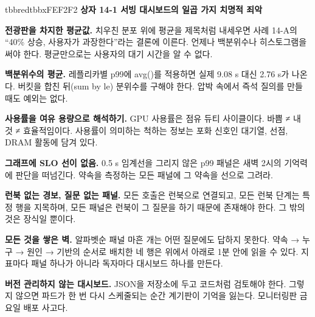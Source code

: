 \begin{calloutbox}{tbbred}{tbbxFEF2F2}
{\normalsize\bfseries\color{tbbx991B1B}상자 14-1  서빙 대시보드의 일곱 가지 치명적 죄악}\par\vspace{3pt}
\begin{tbbitemize}
  \item \textbf{전광판을 차지한 평균값.} 치우친 분포 위에 평균을 제목처럼 내세우면 사례 14-A의 “40\% 상승, 사용자가 과장한다”라는 결론에 이른다. 언제나 백분위수나 히스토그램을 써야 한다. 평균만으로는 사용자의 대기 시간을 알 수 없다.
  \item \textbf{백분위수의 평균.} 레플리카별 p99에 avg()를 적용하면 실제 9.08 s 대신 2.76 s가 나온다. 버킷을 합친 뒤(sum by le) 분위수를 구해야 한다. 압박 속에서 즉석 질의를 만들 때도 예외는 없다.
  \item \textbf{사용률을 여유 용량으로 해석하기.} GPU 사용률은 점유 듀티 사이클이다. 바쁨 ≠ 내 것 ≠ 효율적임이다. 사용률이 의미하는 척하는 정보는 포화 신호인 대기열, 선점, DRAM 활동에 담겨 있다.
  \item \textbf{그래프에 SLO 선이 없음.} 0.5 s 임계선을 그리지 않은 p99 패널은 새벽 2시의 기억력에 판단을 떠넘긴다. 약속을 측정하는 모든 패널에 그 약속을 선으로 그려라.
  \item \textbf{런북 없는 경보, 질문 없는 패널.} 모든 호출은 런북으로 연결되고, 모든 런북 단계는 특정 행을 지목하며, 모든 패널은 런북이 그 질문을 하기 때문에 존재해야 한다. 그 밖의 것은 장식일 뿐이다.
  \item \textbf{모든 것을 쌓은 벽.} 알파벳순 패널 마흔 개는 어떤 질문에도 답하지 못한다. 약속 → 누구 → 원인 → 기반의 순서로 배치한 네 행은 위에서 아래로 1분 안에 읽을 수 있다. 지표마다 패널 하나가 아니라 독자마다 대시보드 하나를 만든다.
  \item \textbf{버전 관리하지 않는 대시보드.} JSON을 저장소에 두고 코드처럼 검토해야 한다. 그렇지 않으면 파드가 한 번 다시 스케줄되는 순간 계기판이 기억을 잃는다. 모니터링판 금요일 배포 사고다.
\end{tbbitemize}
\end{calloutbox}

